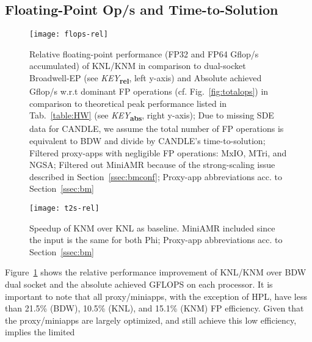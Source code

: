 \subsection{Floating-Point Op/s and Time-to-Solution}\label{ssec:eval_flops}
%
\begin{figure}[tbp]
    \centering
    \texttt{[image: flops-rel]}
    \caption{\label{fig:flops} Relative floating-point performance (FP32 and FP64 \unit[]{Gflop/s} accumulated) of KNL/KNM in comparison to dual-socket Broadwell-EP (see \textit{KEY}\textbf{\textsubscript{rel}}, left y-axis) and Absolute achieved \unit[]{Gflop/s} w.r.t dominant FP operations (cf. Fig.~\ref{fig:totalops}) in comparison to theoretical peak performance listed in Tab.~\ref{table:HW} (see \textit{KEY}\textbf{\textsubscript{abs}}, right y-axis); Due to missing SDE data for CANDLE, we assume the total number of FP operations is equivalent to BDW and divide by CANDLE's time-to-solution; Filtered proxy-apps with negligible FP operations: MxIO, MTri, and NGSA; Filtered out MiniAMR because of the strong-scaling issue described in Section~\ref{ssec:bmconf}; Proxy-app abbreviations acc. to Section~\ref{ssec:bm}}
\end{figure}
\begin{figure}[tbp]
    \centering
    \texttt{[image: t2s-rel]}
    \caption{\label{fig:t2s-knl-vs-knm} Speedup of KNM over KNL as baseline. MiniAMR included since the input is the same for both Phi; Proxy-app abbreviations acc. to Section~\ref{ssec:bm}}
\end{figure}
%
Figure~\ref{fig:flops} shows the relative performance improvement of KNL/KNM over BDW dual socket and the absolute achieved GFLOPS on each processor. It is important to note that all proxy/miniapps, with the exception of HPL, have less than 21.5\% (BDW), 10.5\% (KNL), and 15.1\% (KNM) FP efficiency. Given that the proxy/miniapps are largely optimized, and still achieve this low efficiency, implies the limited 

